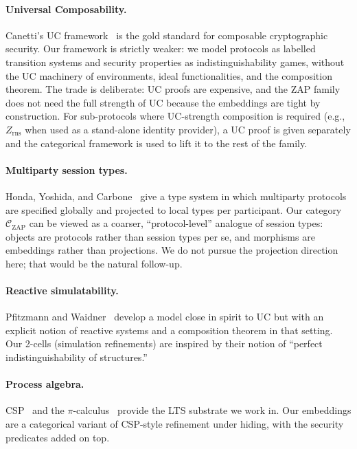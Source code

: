 \documentclass[11pt]{article}
\theoremstyle{definition}
\theoremstyle{remark}
\newcommand{\CZ}{\mathcal{C}_{\mathrm{ZAP}}}
\newcommand{\Zr}{Z_{\mathrm{rns}}}
\begin{document}
\paragraph{Universal Composability.}
Canetti's UC framework~\cite{canetti2001uc, canetti2020uc} is the
gold standard for composable cryptographic security. Our framework is
strictly weaker: we model protocols as labelled transition systems
and security properties as indistinguishability games, without the
UC machinery of environments, ideal functionalities, and the
composition theorem. The trade is deliberate: UC proofs are
expensive, and the ZAP family does not need the full strength of UC
because the embeddings are tight by construction. For sub-protocols
where UC-strength composition is required (e.g., $\Zr$ when used as
a stand-alone identity provider), a UC proof is given separately
and the categorical framework is used to lift it to the rest of the
family.

\paragraph{Multiparty session types.}
Honda, Yoshida, and Carbone~\cite{honda2016multiparty} give a type
system in which multiparty protocols are specified globally and
projected to local types per participant. Our category $\CZ$ can be
viewed as a coarser, ``protocol-level'' analogue of session types:
objects are protocols rather than session types per se, and morphisms
are embeddings rather than projections. We do not pursue the
projection direction here; that would be the natural follow-up.

\paragraph{Reactive simulatability.}
Pfitzmann and Waidner~\cite{pfitzmann2000reactive, pfitzmann2001model}
develop a model close in spirit to UC but with an explicit notion of
reactive systems and a composition theorem in that setting. Our
2-cells (simulation refinements) are inspired by their notion of
``perfect indistinguishability of structures.''

\paragraph{Process algebra.}
CSP~\cite{hoare1985csp} and the
$\pi$-calculus~\cite{milner1999pi} provide the LTS substrate we work
in. Our embeddings are a categorical variant of CSP-style refinement
under hiding, with the security predicates added on top.
\end{document}
